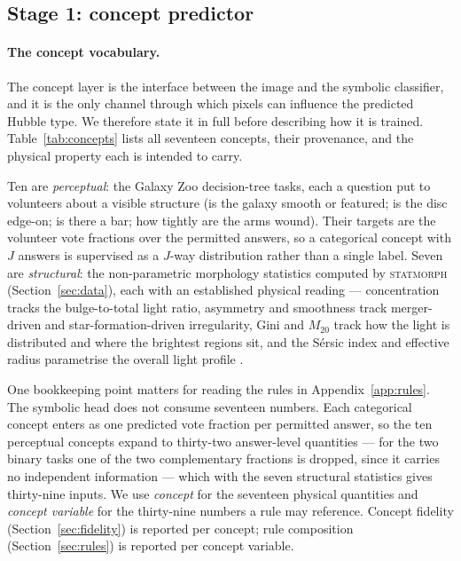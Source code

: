 \documentclass[11pt]{article}
\begin{document}
\subsection{Stage 1: concept predictor}
\label{sec:stage1}

\paragraph{The concept vocabulary.}
The concept layer is the interface between the image and the symbolic
classifier, and it is the only channel through which pixels can influence the
predicted Hubble type. We therefore state it in full before describing how it
is trained. Table~\ref{tab:concepts} lists all seventeen concepts, their
provenance, and the physical property each is intended to carry.

Ten are \emph{perceptual}: the Galaxy Zoo decision-tree tasks, each a question
put to volunteers about a visible structure (is the galaxy smooth or featured;
is the disc edge-on; is there a bar; how tightly are the arms wound). Their
targets are the volunteer vote fractions over the permitted answers, so a
categorical concept with $J$ answers is supervised as a $J$-way distribution
rather than a single label. Seven are \emph{structural}: the non-parametric
morphology statistics computed by \textsc{statmorph}
(Section~\ref{sec:data}), each with an established physical reading
--- concentration tracks the bulge-to-total light ratio, asymmetry and
smoothness track merger-driven and star-formation-driven irregularity, Gini
and $M_{20}$ track how the light is distributed and where the brightest
regions sit, and the S\'ersic index and effective radius parametrise the
overall light profile \citep{conselice2003,lotz2004,rodriguez2019}.

One bookkeeping point matters for reading the rules in
Appendix~\ref{app:rules}. The symbolic head does not consume seventeen
numbers. Each categorical concept enters as one predicted vote fraction per
permitted answer, so the ten perceptual concepts expand to thirty-two
answer-level quantities --- for the two binary tasks one of the two
complementary fractions is dropped, since it carries no independent
information --- which with the seven structural statistics gives thirty-nine
inputs. We use \emph{concept} for the seventeen physical
quantities and \emph{concept variable} for the thirty-nine numbers a rule may
reference. Concept fidelity (Section~\ref{sec:fidelity}) is reported per
concept; rule composition (Section~\ref{sec:rules}) is reported per concept
variable.
\end{document}
